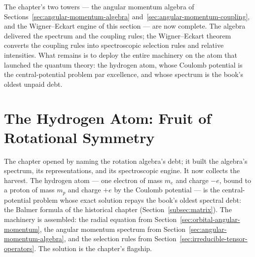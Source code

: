The chapter's two towers --- the angular momentum algebra of Sections~\ref{sec:angular-momentum-algebra} and~\ref{sec:angular-momentum-coupling}, and the Wigner--Eckart engine of this section --- are now complete. The algebra delivered the spectrum and the coupling rules; the Wigner--Eckart theorem converts the coupling rules into spectroscopic selection rules and relative intensities. What remains is to deploy the entire machinery on the atom that launched the quantum theory: the hydrogen atom, whose Coulomb potential is the central-potential problem par excellence, and whose spectrum is the book's oldest unpaid debt.

\section{The Hydrogen Atom: Fruit of Rotational Symmetry}
\label{sec:hydrogen-atom}

The chapter opened by naming the rotation algebra's debt; it built the algebra's spectrum, its representations, and its spectroscopic engine. It now collects the harvest. The hydrogen atom --- one electron of mass $m_e$ and charge $-e$, bound to a proton of mass $m_p$ and charge $+e$ by the Coulomb potential --- is the central-potential problem whose exact solution repays the book's oldest spectral debt: the Balmer formula of the historical chapter (Section~\ref{subsec:matrix}). The machinery is assembled: the radial equation from Section~\ref{sec:orbital-angular-momentum}, the angular momentum spectrum from Section~\ref{sec:angular-momentum-algebra}, and the selection rules from Section~\ref{sec:irreducible-tensor-operators}. The solution is the chapter's flagship.

